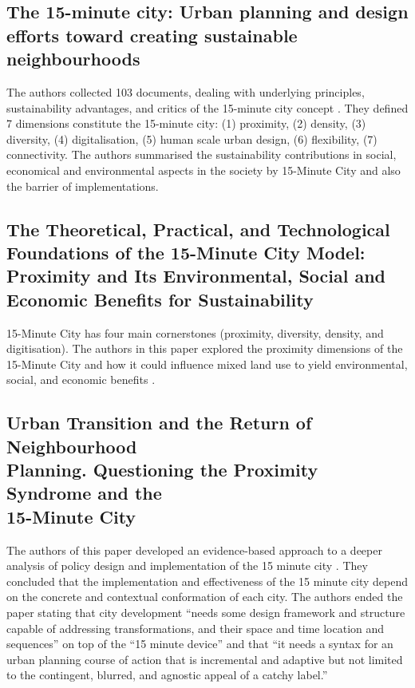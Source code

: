 \subsection{The 15-minute city: Urban planning and design efforts toward creating sustainable neighbourhoods}

The authors collected 103 documents, dealing with underlying principles, sustainability advantages, and critics of the 15-minute city concept \cite{khavarian-garmsir_15-minute_2023}. They defined 7 dimensions constitute the 15-minute city: (1) proximity, (2) density, (3) diversity, (4) digitalisation, (5) human scale
urban design, (6) flexibility, (7) connectivity. The authors summarised the sustainability contributions in social, economical and environmental aspects in the society by 15-Minute City and also the barrier of implementations.

\subsection{The Theoretical, Practical, and Technological Foundations of the 15-Minute City Model: Proximity and Its Environmental, Social and Economic Benefits for Sustainability}

15-Minute City has four main cornerstones (proximity, diversity, density, and digitisation). The authors in this paper explored the proximity dimensions of the 15-Minute City and how it could influence mixed land use to yield environmental, social, and economic benefits \cite{allam_theoretical_2022}.

\subsection{Urban Transition and the Return of Neighbourhood \\ Planning. Questioning the Proximity Syndrome and the \\ 15-Minute City}

The authors of this paper developed an evidence-based approach to a deeper analysis of policy design and implementation of the 15 minute city \cite{marchigiani_urban_2022}. They concluded that the implementation and effectiveness of the 15 minute city depend on the concrete and contextual conformation of each city. The authors ended the paper stating that city development “needs some design framework and structure capable of addressing transformations, and their space and time location and sequences” on top of the “15 minute device” and that “it needs a syntax for an urban planning course of action that is incremental and adaptive but not limited to the contingent, blurred, and agnostic appeal of a catchy label.”